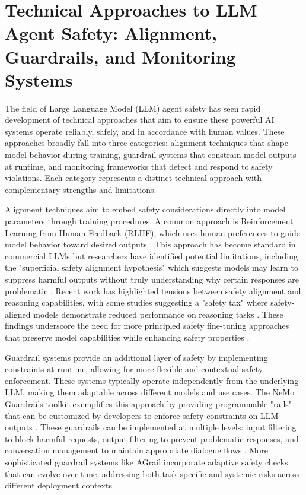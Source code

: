 \documentclass[conference]{IEEEtran}
\begin{document}
\section{Technical Approaches to LLM Agent Safety: Alignment, Guardrails, and Monitoring Systems}

The field of Large Language Model (LLM) agent safety has seen rapid development of technical approaches that aim to ensure these powerful AI systems operate reliably, safely, and in accordance with human values. These approaches broadly fall into three categories: alignment techniques that shape model behavior during training, guardrail systems that constrain model outputs at runtime, and monitoring frameworks that detect and respond to safety violations. Each category represents a distinct technical approach with complementary strengths and limitations.

Alignment techniques aim to embed safety considerations directly into model parameters through training procedures. A common approach is Reinforcement Learning from Human Feedback (RLHF), which uses human preferences to guide model behavior toward desired outputs \cite{2409.07772}. This approach has become standard in commercial LLMs but researchers have identified potential limitations, including the "superficial safety alignment hypothesis" which suggests models may learn to suppress harmful outputs without truly understanding why certain responses are problematic \cite{2410.10862}. Recent work has highlighted tensions between safety alignment and reasoning capabilities, with some studies suggesting a "safety tax" where safety-aligned models demonstrate reduced performance on reasoning tasks \cite{2503.00555}. These findings underscore the need for more principled safety fine-tuning approaches that preserve model capabilities while enhancing safety properties \cite{2501.11183}.

Guardrail systems provide an additional layer of safety by implementing constraints at runtime, allowing for more flexible and contextual safety enforcement. These systems typically operate independently from the underlying LLM, making them adaptable across different models and use cases. The NeMo Guardrails toolkit exemplifies this approach by providing programmable "rails" that can be customized by developers to enforce safety constraints on LLM outputs \cite{2310.10501}. These guardrails can be implemented at multiple levels: input filtering to block harmful requests, output filtering to prevent problematic responses, and conversation management to maintain appropriate dialogue flows \cite{2402.01822}. More sophisticated guardrail systems like AGrail incorporate adaptive safety checks that can evolve over time, addressing both task-specific and systemic risks across different deployment contexts \cite{2502.11448}.
\end{document}
